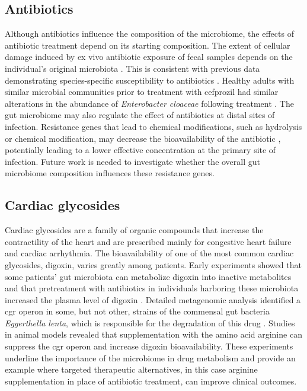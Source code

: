 \subsection{Antibiotics}
Although antibiotics influence the composition of the microbiome, the effects of antibiotic treatment depend on its starting composition. The extent of cellular damage induced by ex vivo antibiotic exposure of fecal samples depends on the individual's original microbiota \cite{RN4095}. This is consistent with previous data demonstrating species-specific susceptibility to antibiotics \cite{RN4096}. Healthy adults with similar microbial communities prior to treatment with cefprozil had similar alterations in the abundance of \textit{Enterobacter cloaceae} following treatment \cite{RN4097}. The gut microbiome may also regulate the effect of antibiotics at distal sites of infection. Resistance genes that lead to chemical modifications, such as hydrolysis or chemical modification, may decrease the bioavailability of the antibiotic \cite{RN4098}, potentially leading to a lower effective concentration at the primary site of infection. Future work is needed to investigate whether the overall gut microbiome composition influences these resistance genes.

\subsection{Cardiac glycosides}
Cardiac glycosides are a family of organic compounds that increase the contractility of the heart and are prescribed mainly for congestive heart failure and cardiac arrhythmia. The bioavailability of one of the most common cardiac glycosides, digoxin, varies greatly among patients. Early experiments showed that some patients’ gut microbiota can metabolize digoxin into inactive metabolites and that pretreatment with antibiotics in individuals harboring these microbiota increased the plasma level of digoxin \cite{RN4099}. Detailed metagenomic analysis identified a \gls{cgr} operon in some, but not other, strains of the commensal gut bacteria \textit{Eggerthella lenta}, which is responsible for the degradation of this drug \cite{RN4102}. Studies in animal models revealed that supplementation with the amino acid arginine can suppress the cgr operon and increase digoxin bioavailability. These experiments underline the importance of the microbiome in drug metabolism and provide an example where targeted therapeutic alternatives, in this case arginine supplementation in place of antibiotic treatment, can improve clinical outcomes.

